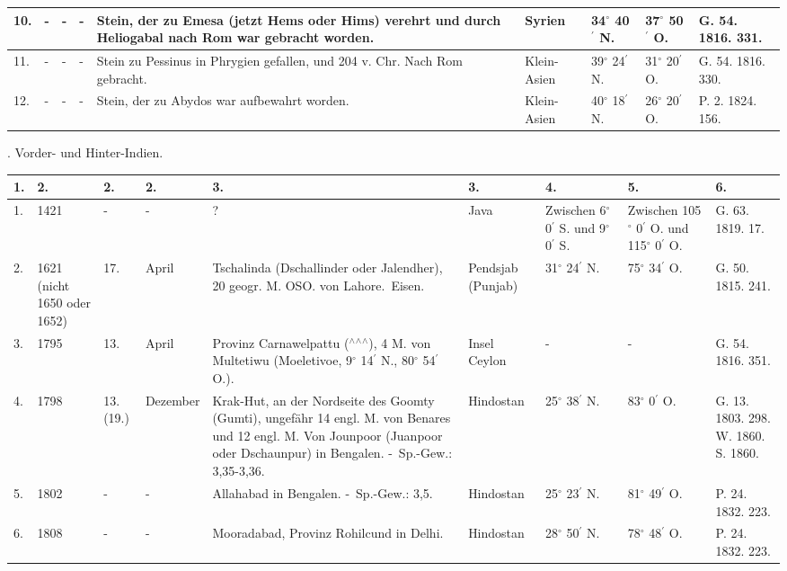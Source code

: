 \documentclass[a4paper, 11pt, oneside, polutonikogreek, german]{article}
\begin{document}
\begin{table}[!ht]
\begin{tabular}{|l|l|l|l|l|l|l|l|l|}
        10. & - & - & - & Stein, der zu Emesa (jetzt Hems oder Hims) verehrt und durch Heliogabal nach Rom war gebracht worden. & Syrien & 34$^\circ$ 40$^\prime$ N. & 37$^\circ$ 50$^\prime$ O. & G. 54. 1816. 331. \\ \hline
        11. & - & - & - & Stein zu Pessinus in Phrygien gefallen, und 204 v. Chr. Nach Rom gebracht. & Klein-Asien & 39$^\circ$ 24$^\prime$ N. & 31$^\circ$ 20$^\prime$ O. & G. 54. 1816. 330. \\ \hline
        12. & - & - & - & Stein, der zu Abydos war aufbewahrt worden. & Klein-Asien & 40$^\circ$ 18$^\prime$ N. & 26$^\circ$ 20$^\prime$ O. & P. 2. 1824. 156. \\ \hline
    \end{tabular}
\end{table}
. Vorder- und Hinter-Indien.
\begin{table}[!ht]
    \centering
    \begin{tabular}{|l|l|l|l|l|l|l|l|l|}
    \hline
        1. & 2. & 2. & 2. & 3. & 3. & 4. & 5. & 6. \\ \hline
        1. & 1421 & - & - & ? & Java & Zwischen 6$^\circ$ 0$^\prime$ S. und 9$^\circ$ 0$^\prime$ S. & Zwischen 105$^\circ$ 0$^\prime$ O. und 115$^\circ$ 0$^\prime$ O. & G. 63. 1819. 17. \\ \hline
        2. & 1621 (nicht 1650 oder 1652) & 17. & April & Tschalinda (Dschallinder oder Jalendher), 20 geogr. M. OSO. von Lahore. Eisen. & Pendsjab (Punjab) & 31$^\circ$ 24$^\prime$ N. & 75$^\circ$ 34$^\prime$ O. & G. 50. 1815. 241. \\ \hline
        3. & 1795 & 13. & April & Provinz Carnawelpattu ($^\wedge$$^\wedge$$^\wedge$), 4 M. von Multetiwu (Moeletivoe, 9$^\circ$ 14$^\prime$ N., 80$^\circ$ 54$^\prime$ O.). & Insel Ceylon & - & - & G. 54. 1816. 351. \\ \hline
        4. & 1798 & 13. (19.) & Dezember & Krak-Hut, an der Nordseite des Goomty (Gumti), ungefähr 14 engl. M. von Benares und 12 engl. M. Von Jounpoor (Juanpoor oder Dschaunpur) in Bengalen. - Sp.-Gew.: 3,35-3,36. & Hindostan & 25$^\circ$ 38$^\prime$ N. & 83$^\circ$ 0$^\prime$ O. & G. 13. 1803. 298. W. 1860. S. 1860. \\ \hline
        5. & 1802 & - & - & Allahabad in Bengalen. - Sp.-Gew.: 3,5. & Hindostan & 25$^\circ$ 23$^\prime$ N. & 81$^\circ$ 49$^\prime$ O. & P. 24. 1832. 223. \\ \hline
        6. & 1808 & - & - & Mooradabad, Provinz Rohilcund in Delhi. & Hindostan & 28$^\circ$ 50$^\prime$ N. & 78$^\circ$ 48$^\prime$ O. & P. 24. 1832. 223. \\ \hline

\end{tabular}
\end{table}
\end{document}
